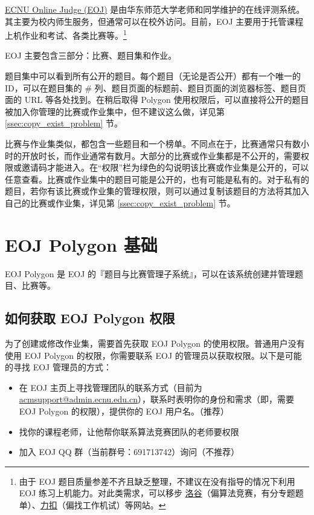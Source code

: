 \documentclass[oneside]{book}
\begin{document}
\label{sec:eoj_basics}

\href{https://acm.ecnu.edu.cn/}{ECNU Online Judge (EOJ)} 是由华东师范大学老师和同学维护的在线评测系统。其主要为校内师生服务，但通常可以在校外访问。目前，EOJ 主要用于托管课程上机作业和考试、各类比赛等。\footnote{由于 EOJ 题目质量参差不齐且缺乏整理，不建议在没有指导的情况下利用 EOJ 练习上机能力。对此类需求，可以移步 \href{https://www.luogu.com.cn/}{洛谷}（偏算法竞赛，有分专题题单）、\href{https://leetcode.cn/}{力扣}（偏找工作机试）等网站。}

EOJ 主要包含三部分：比赛、题目集和作业。

题目集中可以看到所有公开的题目。每个题目（无论是否公开）都有一个唯一的 ID，可以在题目集的 \# 列、题目页面的标题前、题目页面的浏览器标签、题目页面的 URL 等各处找到。在稍后取得 Polygon 使用权限后，可以直接将公开的题目被加入你管理的比赛或作业集中，但不建议这么做，详见第 \ref{ssec:copy_exist_problem} 节。

比赛与作业集类似，都包含一些题目和一个榜单。不同点在于，比赛通常只有数小时的开放时长，而作业通常有数月。大部分的比赛或作业集都是不公开的，需要权限或邀请码才能进入。在``权限''栏为绿色的勾说明该比赛或作业集是公开的，可以任意查看。比赛或作业集中的题目可能是公开的，也有可能是私有的。对于私有的题目，若你有该比赛或作业集的管理权限，则可以通过复制该题目的方法将其加入自己的比赛或作业集，详见第 \ref{ssec:copy_exist_problem} 节。

\section{EOJ Polygon 基础}

EOJ Polygon 是 EOJ 的『题目与比赛管理子系统』，可以在该系统创建并管理题目、比赛等。

\subsection{如何获取 EOJ Polygon 权限}

\label{ssec:eoj_polygon_permission}

为了创建或修改作业集，需要首先获取 EOJ Polygon 的使用权限。普通用户没有使用 EOJ Polygon 的权限，你需要联系 EOJ 的管理员以获取权限。以下是可能的寻找 EOJ 管理员的方式：

\begin{itemize}
    \item 在 EOJ 主页上寻找管理团队的联系方式（目前为 \href{mailto:acmsupport@admin.ecnu.edu.cn}{acmsupport@admin.ecnu.edu.cn}），联系时表明你的身份和需求（即，需要 EOJ Polygon 的权限），提供你的 EOJ 用户名。（推荐）
    \item 找你的课程老师，让他帮你联系算法竞赛团队的老师要权限
    \item 加入 EOJ QQ 群（当前群号：691713742）询问（不推荐）
\end{itemize}
\end{document}
